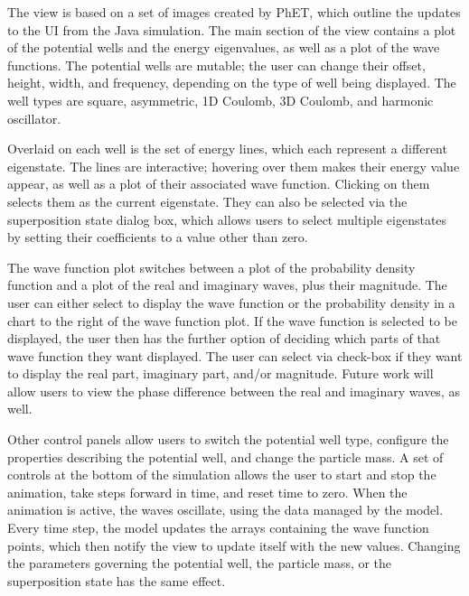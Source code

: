 The view is based on a set of images created by PhET, which outline the updates to the UI from the
Java simulation.  The main section of the view contains a plot of the potential wells and the energy
eigenvalues, as well as a plot of the wave functions.  The potential wells are mutable; the user can
change their offset, height, width, and frequency, depending on the type of well being displayed.
The well types are square, asymmetric, 1D Coulomb, 3D Coulomb, and harmonic oscillator.  

Overlaid on each well is the set of energy lines, which each represent a different eigenstate.  The
lines are interactive; hovering over them makes their energy value appear, as well as a plot of
their associated wave function.  Clicking on them selects them as the current eigenstate.  They can
also be selected via the superposition state dialog box, which allows users to select multiple
eigenstates by setting their coefficients to a value other than zero.

The wave function plot switches between a plot of the probability density function and a plot of the
real and imaginary waves, plus their magnitude. The user can either select to display the wave
function or the probability density in a chart to the right of the wave function plot. If the wave
function is selected to be displayed, the user then has the further option of deciding which parts
of that wave function they want displayed. The user can select via check-box if they want to display
the real part, imaginary part, and/or magnitude.  Future work will allow users to view the phase
difference between the real and imaginary waves, as well.

Other control panels allow users to switch the potential well type, configure the properties
describing the potential well, and change the particle mass.  A set of controls at the bottom of the
simulation allows the user to start and stop the animation, take steps forward in time, and reset
time to zero.  When the animation is active, the waves oscillate, using the data managed by the
model.  Every time step, the model updates the arrays containing the wave function points, which
then notify the view to update itself with the new values.  Changing the parameters governing the
potential well, the particle mass, or the superposition state has the same effect.

